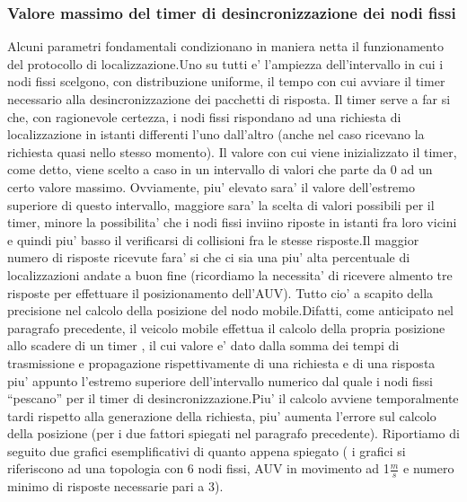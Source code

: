\subsubsection{Valore massimo del timer di desincronizzazione dei nodi fissi}
Alcuni parametri fondamentali condizionano in maniera netta il funzionamento del protocollo di localizzazione.\newline Uno su tutti e' l'ampiezza dell'intervallo
in cui i nodi fissi scelgono, con distribuzione uniforme, il tempo con cui avviare il timer necessario alla desincronizzazione dei pacchetti di risposta.\newline
Il timer serve a far si che, con ragionevole certezza, i nodi fissi rispondano ad una richiesta di localizzazione in istanti differenti l'uno dall'altro (anche nel caso ricevano la richiesta quasi nello stesso momento).\newline
Il valore con cui viene inizializzato il timer, come detto, viene scelto a caso in un intervallo di valori che parte da 0 ad un certo valore massimo.\newline
Ovviamente, piu' elevato sara' il valore dell'estremo superiore di questo intervallo, maggiore sara' la scelta di valori possibili per il timer, minore la possibilita' che i nodi fissi inviino riposte in istanti fra loro vicini e quindi
piu' basso il verificarsi di collisioni fra le stesse risposte.\newline Il maggior numero di risposte ricevute fara' si che ci sia una piu' alta percentuale di localizzazioni andate a buon fine (ricordiamo la necessita' di ricevere almento tre risposte per effettuare il posizionamento dell'AUV).\newline
Tutto cio' a scapito della precisione nel calcolo della posizione del nodo mobile.\newline Difatti, come anticipato nel paragrafo precedente, il veicolo mobile effettua il calcolo della propria posizione allo scadere di un timer , il cui valore e' dato dalla somma dei tempi di  trasmissione e propagazione rispettivamente di una richiesta e di una risposta piu' appunto l'estremo superiore dell'intervallo numerico dal quale i nodi fissi ``pescano'' per il timer di desincronizzazione.\newline Piu' il calcolo avviene temporalmente tardi rispetto alla generazione della richiesta, piu' aumenta l'errore sul calcolo della posizione (per i due fattori spiegati nel paragrafo precedente).\newline
Riportiamo di seguito due grafici esemplificativi di quanto appena spiegato ( i grafici si riferiscono ad una topologia con 6 nodi fissi, AUV in movimento ad 1$\frac{m}{s}$ e numero minimo di risposte necessarie pari a 3).
